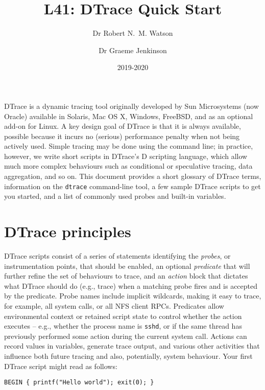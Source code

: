 \documentclass[a4paper,10pt]{article}
\begin{document}
\newcommand{\code}[1]{\texttt{\small #1}}

\title{L41: DTrace Quick Start}
\author{Dr Robert N.~M. Watson \and Dr Graeme Jenkinson}
\date{2019-2020}
\maketitle

DTrace is a dynamic tracing tool originally developed by Sun Microsystems (now
Oracle) available in Solaris, Mac OS X, Windows, FreeBSD, and as an optional
add-on for Linux.
A key design goal of DTrace is that it is always available, possible
because it incurs no (serious) performance penalty when not being actively
used.
Simple tracing may be done using the command line; in practice, however, we
write short scripts in DTrace's D scripting language, which allow much more
complex behaviours such as conditional or speculative tracing, data
aggregation, and so on.
This document provides a short glossary of DTrace terms, information on the
\code{dtrace} command-line tool, a few sample DTrace scripts to get you
started, and a list of commonly used probes and built-in variables.

\section*{DTrace principles}

DTrace scripts consist of a series of statements identifying the
\textit{probes}, or instrumentation points, that should be enabled, an
optional \textit{predicate} that will further refine the set of behaviours to
trace, and an \textit{action} block that dictates what DTrace should do (e.g.,
trace) when a matching probe fires and is accepted by the predicate.
Probe names include implicit wildcards, making it easy to trace, for example,
all system calls, or all NFS client RPCs.
Predicates allow environmental context or retained script state to control
whether the action executes -- e.g., whether the process name is \code{sshd},
or if the same thread has previously performed some action during the current
system call.
Actions can record values in variables, generate trace output, and various
other activities that influence both future tracing and also, potentially,
system behaviour.
Your first DTrace script might read as follows:

\begin{small}
\begin{verbatim}
BEGIN { printf("Hello world"); exit(0); }
\end{verbatim}
\end{small}
\end{document}
